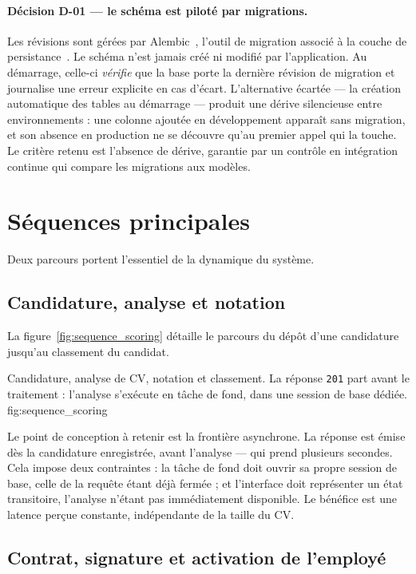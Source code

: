 \paragraph{Décision D-01 — le schéma est piloté par migrations.}
Les révisions sont gérées par Alembic~\cite{alembic}, l'outil de migration
associé à la couche de persistance~\cite{sqlalchemy}.
Le schéma n'est jamais créé ni modifié par l'application. Au démarrage,
celle-ci \emph{vérifie} que la base porte la dernière révision de migration et
journalise une erreur explicite en cas d'écart. L'alternative écartée — la
création automatique des tables au démarrage — produit une dérive silencieuse
entre environnements : une colonne ajoutée en développement apparaît sans
migration, et son absence en production ne se découvre qu'au premier appel qui
la touche. Le critère retenu est l'absence de dérive, garantie par un contrôle
en intégration continue qui compare les migrations aux modèles.

\section{Séquences principales}
\label{sec:dynamic_views}

Deux parcours portent l'essentiel de la dynamique du système.

\subsection{Candidature, analyse et notation}

La figure~\ref{fig:sequence_scoring} détaille le parcours du dépôt d'une
candidature jusqu'au classement du candidat.

  {Candidature, analyse de CV, notation et classement. La réponse
   \texttt{201} part avant le traitement : l'analyse s'exécute en tâche de
   fond, dans une session de base dédiée.}
  {fig:sequence_scoring}

Le point de conception à retenir est la frontière asynchrone. La réponse est
émise dès la candidature enregistrée, avant l'analyse — qui prend plusieurs
secondes. Cela impose deux contraintes : la tâche de fond doit ouvrir sa propre
session de base, celle de la requête étant déjà fermée ; et l'interface doit
représenter un état transitoire, l'analyse n'étant pas immédiatement
disponible. Le bénéfice est une latence perçue constante, indépendante de la
taille du CV.

\subsection{Contrat, signature et activation de l'employé}

